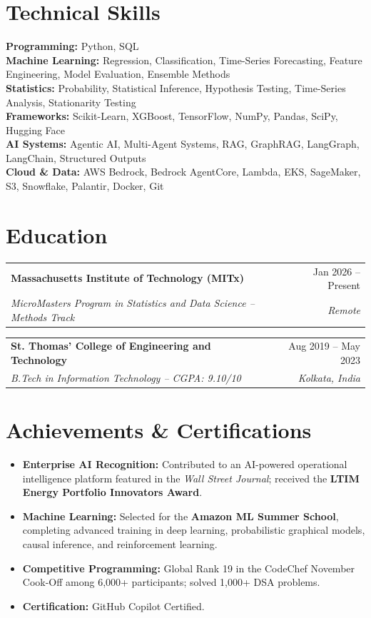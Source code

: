 \documentclass[letterpaper,10pt]{article}
\makeatletter
\newcommand{\resumeSubheading}[4]{
  \begin{tabularx}{\textwidth}{@{}Xr@{}}
    \textbf{#1} & #2 \\
    \textit{\small #3} & \textit{\small #4} \\
  \end{tabularx}\vspace{-5pt}
}
\newcommand{\resumeItem}[1]{\item \small{#1}}
\newcommand{\resumeItemListStart}{
  \begin{itemize}[leftmargin=0.18in,label=\textbullet,itemsep=0pt,topsep=1pt,parsep=0pt,partopsep=0pt]
}
\newcommand{\resumeItemListEnd}{\end{itemize}\vspace{-2pt}}
\makeatother
\begin{document}
\section{Technical Skills}
\small{
\textbf{Programming:} Python, SQL \\
\textbf{Machine Learning:} Regression, Classification, Time-Series Forecasting, Feature Engineering, Model Evaluation, Ensemble Methods \\
\textbf{Statistics:} Probability, Statistical Inference, Hypothesis Testing, Time-Series Analysis, Stationarity Testing \\
\textbf{Frameworks:} Scikit-Learn, XGBoost, TensorFlow, NumPy, Pandas, SciPy, Hugging Face \\
\textbf{AI Systems:} Agentic AI, Multi-Agent Systems, RAG, GraphRAG, LangGraph, LangChain, Structured Outputs \\
\textbf{Cloud \& Data:} AWS Bedrock, Bedrock AgentCore, Lambda, EKS, SageMaker, S3, Snowflake, Palantir, Docker, Git
}

\section{Education}

\resumeSubheading
  {Massachusetts Institute of Technology (MITx)}
  {Jan 2026 -- Present}
  {MicroMasters Program in Statistics and Data Science -- Methods Track}
  {Remote}

\resumeSubheading
  {St. Thomas' College of Engineering and Technology}
  {Aug 2019 -- May 2023}
  {B.Tech in Information Technology -- CGPA: 9.10/10}
  {Kolkata, India}

\section{Achievements \& Certifications}
\resumeItemListStart
  \resumeItem{\textbf{Enterprise AI Recognition:} Contributed to an AI-powered operational intelligence platform featured in the \textit{Wall Street Journal}; received the \textbf{LTIM Energy Portfolio Innovators Award}.}
  \resumeItem{\textbf{Machine Learning:} Selected for the \textbf{Amazon ML Summer School}, completing advanced training in deep learning, probabilistic graphical models, causal inference, and reinforcement learning.}
  \resumeItem{\textbf{Competitive Programming:} Global Rank 19 in the CodeChef November Cook-Off among 6,000+ participants; solved 1,000+ DSA problems.}
  \resumeItem{\textbf{Certification:} GitHub Copilot Certified.}
\resumeItemListEnd
\end{document}
